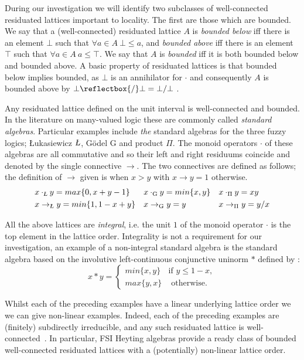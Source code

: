 \documentclass{lmcs} %
\newcommand{\?}{\ensuremath{\mkern0.4\thinmuskip}}
\newcommand{\Luk}{\text{\textsl{\L}}}%
\newcommand{\und}{\mathord{\reflectbox{/}}}%
\begin{document}
During our investigation we will identify two subclasses of well-connected residuated lattices important to locality. The first are those which are bounded. We say that a (well-connected) residuated lattice $A$ is \emph{bounded below} iff there is an element $\bot$ such that $\forall a\in A\ \bot\leq a$, and \emph{bounded above} iff there is an element $\top$ such that $\forall a\in A\ a\leq \top$. We say that $A$ is \emph{bounded} iff it is both bounded below and bounded above. A basic property of residuated lattices is that bounded below implies bounded, as $\bot$ is an annihilator for $\cdot$ and consequently $A$ is bounded above by $\bot\und\bot=\bot/\bot$ \cite[Section 2.2]{GalatosJipsenKowalskiOno07:Resilattice}. 

\begin{exa}\label{exa:wellconnectboundresi}
Any residuated lattice defined on the unit interval is well-connected and bounded. In the literature on many-valued logic these are commonly called \emph{standard algebras}. Particular examples include \textit{the} standard algebras for the three fuzzy logics; \L ukasiewicz $\Luk$, G\"{o}del $\mathrm{G}$ and product $\Pi$. The monoid operators $\cdot$ of these algebras are all commutative and so their left and right residuums coincide and denoted by the single connective $\rightarrow$. The two connectives are defined as follows; the definition of $\rightarrow$ given is when $x>y$ with $x\rightarrow y=1$ otherwise.\begin{align*}
    x&\cdot_{\Luk}y = max\{0,x+y-1\} & x&\cdot_{\mathrm{G}}y = min\{x,y\} & x&\cdot_{\Pi}y = xy\\
    x&\rightarrow_{\Luk}y = min\{1,1-x+y\} & x&\rightarrow_{\mathrm{G}}y = y & x&\rightarrow_{\Pi}y = y/x 
\end{align*}

All the above lattices are \emph{integral}, i.e. the unit $1$ of the monoid operator $\cdot$ is the top element in the lattice order. Integrality is not a requirement for our investigation, an example of a non-integral standard algebra is the standard algebra based on the involutive left-continuous conjunctive uninorm $\ast$ defined by \cite[Section 2.1]{CintulaHajekNoguera11:Handbookvol1}:\[x\ast y=\begin{cases}
    min\{x,y\} & \text{if }y\leq 1-x,\\
    max\{y,x\} & \text{ otherwise}.
\end{cases}\]
 
Whilst each of the preceding examples have a linear underlying lattice order we we can give non-linear examples. Indeed, each of the preceding examples are (finitely) subdirectly irreducible, and any such residuated lattice is well-connected~\cite[Section 5.3]{GalatosJipsenKowalskiOno07:Resilattice}. In particular, FSI Heyting algebras provide a ready class of bounded well-connected residuated lattices with a (potentially) non-linear lattice order.  
\end{exa}
\end{document}
